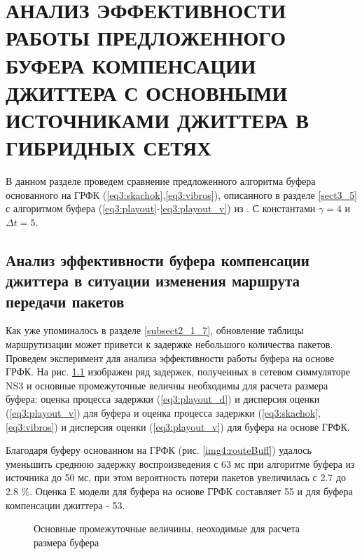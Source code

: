\chapter{АНАЛИЗ ЭФФЕКТИВНОСТИ РАБОТЫ ПРЕДЛОЖЕННОГО БУФЕРА КОМПЕНСАЦИИ ДЖИТТЕРА С ОСНОВНЫМИ ИСТОЧНИКАМИ ДЖИТТЕРА В ГИБРИДНЫХ СЕТЯХ} \label{chapt4}
В данном разделе проведем сравнение предложенного алгоритма буфера основанного на ГРФК (\ref{eq3:skachok},\ref{eq3:vibros}), описанного в разделе \ref{sect3_5} с алгоритмом буфера (\ref{eq3:playout}-\ref{eq3:playout_v}) из \cite{Ramjee}. С константами $\gamma=4$ и $\Delta t=5$.


\section{Анализ эффективности буфера компенсации джиттера в ситуации изменения маршрута передачи пакетов} \label{sect4}

Как уже упоминалось в разделе \ref{subsect2_1_7}, обновление таблицы маршрутизации может приветси к задержке небольшого количества пакетов. Проведем эксперимент для анализа эффективности работы буфера на основе ГРФК. На рис. \ref{img4:routeEst} изображен ряд задержек, полученных в сетевом симмуляторе NS3 и основные промежуточные величны необходимы для расчета размера буфера: оценка процесса задержки (\ref{eq3:playout_d}) и дисперсия оценки (\ref{eq3:playout_v}) для буфера \cite{Ramjee} и оценка процесса задержки (\ref{eq3:skachok},\ref{eq3:vibros}) и дисперсия оценки (\ref{eq3:playout_v}) для буфера на основе ГРФК.

Благодаря буферу основанном на ГРФК (рис. \ref{img4:routeBuff}) удалось уменьшить среднюю задержку воспроизведения с 63 мс при алгоритме буфера из источника \cite{Ramjee} до 50 мс, при этом вероятность потери пакетов увеличилась с 2.7 до 2.8 \%. Оценка Е модели для буфера на основе ГРФК составляет 55 и для буфера компенсации джиттера  \cite{Ramjee} - 53.


\pgfplotsset{width=15cm, height=10cm, compat=1.3}
\begin{figure} [!h]
  \center
{}
\caption{Основные промежуточные величины, неоходимые для расчета размера буфера}
  \label{img4:routeEst}
\end{figure}




